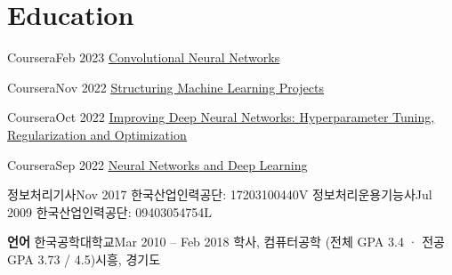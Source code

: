 \section{Education}
    \resumeSubHeadingListStart

    \resumeSubheading
    {Coursera}{Feb 2023}
    {\href{https://www.coursera.org/account/accomplishments/certificate/CBYK8RJU62RS}{\underline{Convolutional Neural Networks}}}{}

    \resumeSubheading
    {Coursera}{Nov 2022}
    {\href{https://www.coursera.org/account/accomplishments/certificate/RDPPP2ZNG25Q}{\underline{Structuring Machine Learning Projects}}}{}

    \resumeSubheading
    {Coursera}{Oct 2022}
    {\href{https://www.coursera.org/account/accomplishments/certificate/C8A3QU5RGZX9}{\underline{Improving Deep Neural Networks: Hyperparameter Tuning, Regularization and Optimization}}}{}

    \resumeSubheading
    {Coursera}{Sep 2022}
    {\href{https://www.coursera.org/account/accomplishments/certificate/JJ3FSYCCK9TZ}{\underline{Neural Networks and Deep Learning}}}{}

    \resumeSubheading
    {정보처리기사}{Nov 2017}
    {한국산업인력공단: 17203100440V}{}
    \resumeSubheading
    {정보처리운용기능사}{Jul 2009}
    {한국산업인력공단: 09403054754L}{}

    \resumeProjectHeading
    {\textbf{언어}}{}
        \resumeItemListStart
        \resumeItemListEnd
    \resumeSubheading
    {한국공학대학교}{Mar 2010 -- Feb 2018}
    {학사, 컴퓨터공학 (전체 GPA 3.4 · 전공 GPA 3.73 / 4.5)}{시흥, 경기도}
        \resumeItemListStart
        \resumeItemListEnd

    \resumeSubHeadingListEnd
